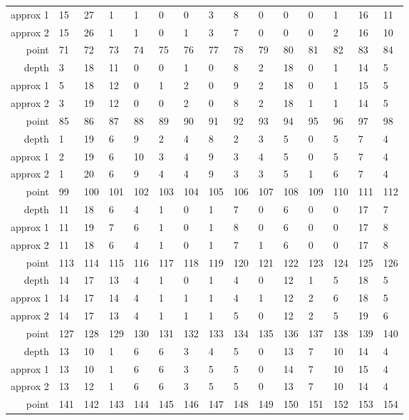 \begin{center}
\begin{supertabular}{|r|l l l l l l l l l l l l l l|}
approx 1 & 15 & 27 & 1 & 1 & 0 & 0 & 3 & 8 & 0 & 0 & 0 & 1 & 16 & 11 \\
approx 2 & 15 & 26 & 1 & 1 & 0 & 1 & 3 & 7 & 0 & 0 & 0 & 2 & 16 & 10 \\
\hline
point & 71 & 72 & 73 & 74 & 75 & 76 & 77 & 78 & 79 & 80 & 81 & 82 & 83 & 84 \\
\hline
depth & 3 & 18 & 11 & 0 & 0 & 1 & 0 & 8 & 2 & 18 & 0 & 1 & 14 & 5 \\
approx 1 & 5 & 18 & 12 & 0 & 1 & 2 & 0 & 9 & 2 & 18 & 0 & 1 & 15 & 5 \\
approx 2 & 3 & 19 & 12 & 0 & 0 & 2 & 0 & 8 & 2 & 18 & 1 & 1 & 14 & 5 \\
\hline
point & 85 & 86 & 87 & 88 & 89 & 90 & 91 & 92 & 93 & 94 & 95 & 96 & 97 & 98 \\
\hline
depth & 1 & 19 & 6 & 9 & 2 & 4 & 8 & 2 & 3 & 5 & 0 & 5 & 7 & 4 \\
approx 1 & 2 & 19 & 6 & 10 & 3 & 4 & 9 & 3 & 4 & 5 & 0 & 5 & 7 & 4 \\
approx 2 & 1 & 20 & 6 & 9 & 4 & 4 & 9 & 3 & 3 & 5 & 1 & 6 & 7 & 4 \\
\hline
point & 99 & 100 & 101 & 102 & 103 & 104 & 105 & 106 & 107 & 108 & 109 & 110 & 111 & 112 \\
\hline
depth & 11 & 18 & 6 & 4 & 1 & 0 & 1 & 7 & 0 & 6 & 0 & 0 & 17 & 7 \\
approx 1 & 11 & 19 & 7 & 6 & 1 & 0 & 1 & 8 & 0 & 6 & 0 & 0 & 17 & 8 \\
approx 2 & 11 & 18 & 6 & 4 & 1 & 0 & 1 & 7 & 1 & 6 & 0 & 0 & 17 & 8 \\
\hline
point & 113 & 114 & 115 & 116 & 117 & 118 & 119 & 120 & 121 & 122 & 123 & 124 & 125 & 126 \\
\hline
depth & 14 & 17 & 13 & 4 & 1 & 0 & 1 & 4 & 0 & 12 & 1 & 5 & 18 & 5 \\
approx 1 & 14 & 17 & 14 & 4 & 1 & 1 & 1 & 4 & 1 & 12 & 2 & 6 & 18 & 5 \\
approx 2 & 14 & 17 & 13 & 4 & 1 & 1 & 1 & 5 & 0 & 12 & 2 & 5 & 19 & 6 \\
\hline
point & 127 & 128 & 129 & 130 & 131 & 132 & 133 & 134 & 135 & 136 & 137 & 138 & 139 & 140 \\
\hline
depth & 13 & 10 & 1 & 6 & 6 & 3 & 4 & 5 & 0 & 13 & 7 & 10 & 14 & 4 \\
approx 1 & 13 & 10 & 1 & 6 & 6 & 3 & 5 & 5 & 0 & 14 & 7 & 10 & 15 & 4 \\
approx 2 & 13 & 12 & 1 & 6 & 6 & 3 & 5 & 5 & 0 & 13 & 7 & 10 & 14 & 4 \\
\hline
point & 141 & 142 & 143 & 144 & 145 & 146 & 147 & 148 & 149 & 150 & 151 & 152 & 153 & 154 \\

\end{supertabular}
\end{center}
